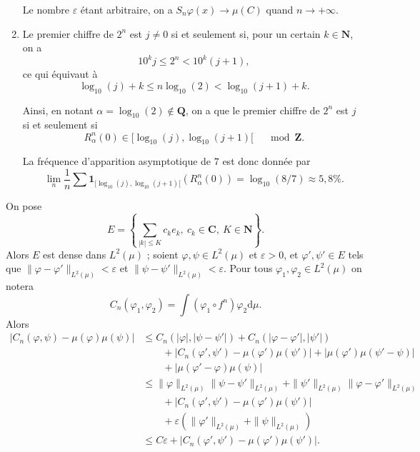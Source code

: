 \documentclass[a4paper,12pt,openany]{article}
\theoremstyle{plain}
\theoremstyle{definition}
\newcommand{\dd}{\mathrm{d}}
\newcommand{\Q}{\mathbf{Q}}
\newcommand{\Z}{\mathbf{Z}}
\newcommand{\N}{\mathbf{N}}
\newcommand{\C}{\mathbf{C}}
\begin{document}
\begin{enumerate}
Le nombre $\varepsilon$ \'etant arbitraire, on a $S_n \varphi(x)\to \mu(C)$ quand $n \to +\infty.$
\item Le premier chiffre de $2^n$ est $j \neq 0$ si et seulement si, pour un certain $k \in \N$, on a
$$
10^kj \leqslant 2^n < 10^k(j+1),
$$
 ce qui \'equivaut \`a 
$$
\log_{10}(j) + k \leqslant n \log_{10}(2) < \log_{10}(j+1) + k.
$$
 
Ainsi, en notant $\alpha = \log_{10}(2) \notin \Q$, on a que le premier chiffre de $2^n$ est $j$ si et seulement si
$$
R_\alpha^n(0) \in [\log_{10}(j), \log_{10}(j+1)[ \quad \mod \Z.
$$

La fr\'equence d'apparition asymptotique de $7$ est donc donn\'ee par
$$
\lim_n \frac{1}{n} \sum \textbf{1}_{[\log_{10}(j), \log_{10}(j+1)[}(R_\alpha^n(0)) = \log_{10}(8/7) \approx 5,8\%.
$$


\end{enumerate}

\vspace{0.6cm}

 \vspace{1.5mm}

\noindent
On pose 
$$
\displaystyle{
E = \left\{ \sum_{|k|\leqslant K} c_k e_k,~c_k \in \C,~K\in \N\right\}.
}
$$
Alors $E$ est dense dans $L^2(\mu)$ ; soient $\varphi, \psi \in L^2(\mu)$ et $\varepsilon > 0$, et $\varphi', \psi' \in E$ tels que $\|\varphi - \varphi'\|_{L^2(\mu)} < \varepsilon$ et $\|\psi - \psi'\|_{L^2(\mu)} < \varepsilon$.  
Pour tous $\varphi_1, \varphi_2 \in L^2(\mu)$ on notera 
$$C_n(\varphi_1, \varphi_2) = \int (\varphi_1 \circ f^n) \varphi_2 \dd \mu.$$  
Alors 
$$
\begin{aligned}
\left|C_n(\varphi, \psi) - \mu(\varphi) \mu(\psi)\right| & \leqslant C_n(|\varphi|, |\psi - \psi'|) + C_n(|\varphi - \varphi'|, |\psi'|) \\
& \quad \quad + \left|C_n(\varphi', \psi') - \mu(\varphi') \mu(\psi')\right| + \left|\mu(\varphi') \mu(\psi' - \psi)\right| \\
& \quad \quad + \left|\mu(\varphi'-\varphi)\mu(\psi)\right|  \\
&\leqslant \|\varphi\|_{L^2(\mu)} \|\psi - \psi'\|_{L^2(\mu)} + \|\psi'\|_{L^2(\mu)} \|\varphi - \varphi'\|_{L^2(\mu)} \\
& \quad \quad + |C_n(\varphi', \psi') - \mu(\varphi') \mu(\psi')| \\
&\quad \quad + \varepsilon \left(\|\varphi'\|_{L^2(\mu)} + \|\psi\|_{L^2(\mu)}\right)  \\
& \leqslant C \varepsilon + \left|C_n(\varphi', \psi') - \mu(\varphi') \mu(\psi')\right|.
\end{aligned}
$$
\end{document}
